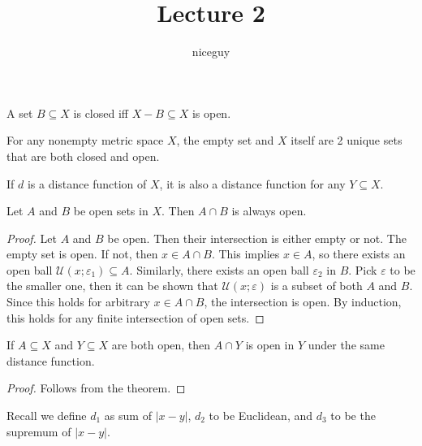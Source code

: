 \documentclass[12pt]{article}
\title{Lecture 2}
\author{niceguy}
\begin{document}
\maketitle

\section{}

\begin{defn}
    A set $B \subseteq X$ is closed iff $X - B \subseteq X$ is open.
\end{defn}

\begin{ex}
    For any nonempty metric space $X$, the empty set and $X$ itself are 2 unique sets that are both closed and open.
\end{ex}

\begin{rem}
    If $d$ is a distance function of $X$, it is also a distance function for any $Y \subseteq X$.
\end{rem}

\begin{thm}
    Let $A$ and $B$ be open sets in $X$. Then $A \cap B$ is always open.
\end{thm}

\begin{proof}
    Let $A$ and $B$ be open. Then their intersection is either empty or not. The empty set is open. If not, then $x \in A \cap B$. This implies $x \in A$, so there exists an open ball $\mathcal U(x;\varepsilon_1) \subseteq A$. Similarly, there exists an open ball $\varepsilon_2$ in $B$. Pick $\varepsilon$ to be the smaller one, then it can be shown that $\mathcal U(x;\varepsilon)$ is a subset of both $A$ and $B$. Since this holds for arbitrary $x \in A \cap B$, the intersection is open. By induction, this holds for any finite intersection of open sets.
\end{proof}

\begin{prop}
    If $A \subseteq X$ and $Y \subseteq X$ are both open, then $A \cap Y$ is open in $Y$ under the same distance function.
\end{prop}

\begin{proof}
    Follows from the theorem.
\end{proof}

Recall we define $d_1$ as sum of $|x-y|$, $d_2$ to be Euclidean, and $d_3$ to be the supremum of $|x-y|$.
\end{document}
